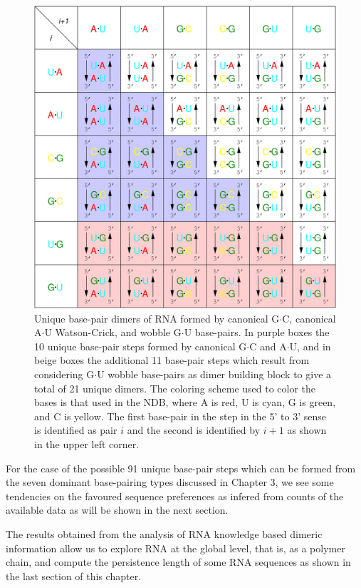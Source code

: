 \begin{figure}
\centering
\includegraphics[angle=0, scale=0.4]{Chapter4/unique.png}
\caption{Unique base-pair dimers of RNA formed by canonical G$\cdot$C,
  canonical    A$\cdot$U    Watson-Crick,    and   wobble    G$\cdot$U
  base-pairs.  In purple  boxes the  10 unique  base-pair steps
  formed  by canonical G$\cdot$C  and A$\cdot$U,  and in  beige boxes
  the  additional  11   base-pair  steps  which   result  from
  considering G$\cdot$U  wobble base-pairs as dimer  building block to
  give a total of 21 unique  dimers. The coloring scheme used to color
  the bases is that  used in the NDB, where A is red,  U is cyan, G is
  green, and C is yellow. The first  base-pair in the step in the 5' to
  3' sense is  identified as pair $i$ and the  second is identified by
  $i+1$ as shown in the upper left corner.}
\label{fig:unique}
\end{figure}  

For the  case of the possible  91 unique base-pair steps  which can be
formed from the seven  dominant base-pairing types discussed in Chapter
3,  we see  some tendencies  on the  favoured sequence  preferences as
infered from counts of the available data as will be shown in the next
section. 

The   results  obtained   from  the  analysis   of  RNA knowledge
based dimeric information allow  us to  explore RNA  at  the global
level, that is, as a polymer chain, and compute the persistence length
of some RNA sequences as shown in the last section of this chapter.

